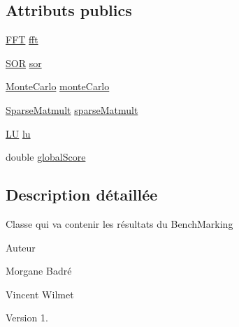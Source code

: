 \subsection*{Attributs publics}
\begin{DoxyCompactItemize}
\item 
\hyperlink{classjnt_1_1BenchMarkResult_1_1FFT}{F\-F\-T} \hyperlink{classjnt_1_1BenchMarkResult_a4ccbb09fa780dd422598546e86c845d7}{fft}
\item 
\hyperlink{classjnt_1_1BenchMarkResult_1_1SOR}{S\-O\-R} \hyperlink{classjnt_1_1BenchMarkResult_a159025733607bd514927639795a47971}{sor}
\item 
\hyperlink{classjnt_1_1BenchMarkResult_1_1MonteCarlo}{Monte\-Carlo} \hyperlink{classjnt_1_1BenchMarkResult_a9f32de31bdbd4ecdf9ea3832825e0ba8}{monte\-Carlo}
\item 
\hyperlink{classjnt_1_1BenchMarkResult_1_1SparseMatmult}{Sparse\-Matmult} \hyperlink{classjnt_1_1BenchMarkResult_abd6ec31f144598923f60d2cc0040df95}{sparse\-Matmult}
\item 
\hyperlink{classjnt_1_1BenchMarkResult_1_1LU}{L\-U} \hyperlink{classjnt_1_1BenchMarkResult_a615ece215df7fa40fa3de24fb62a8d7c}{lu}
\item 
double \hyperlink{classjnt_1_1BenchMarkResult_aaea8ab4bb0f7f2fa52f719b0846c3a84}{global\-Score}
\end{DoxyCompactItemize}


\subsection{Description détaillée}
Classe qui va contenir les résultats du Bench\-Marking \begin{DoxyAuthor}{Auteur}

\begin{DoxyItemize}
\item Morgane Badré 
\item Vincent Wilmet 
\end{DoxyItemize}
\end{DoxyAuthor}
\begin{DoxyVersion}{Version}
1. 
\end{DoxyVersion}


